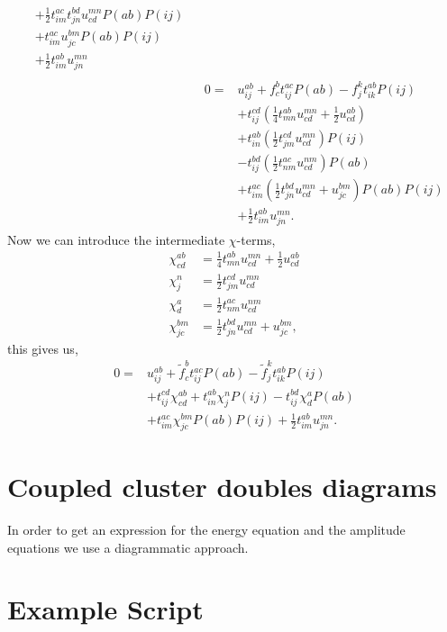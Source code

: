\documentclass[
    a4paper, aps, twocolumn, floatfix, superscriptaddress,
    nofootinbib]{revtex4-1}
\newcommand{\1}{\mathds{1}}
\begin{document}
\begin{align}
\begin{aligned}
          &+ \frac{1}{2}t^{ac}_{im} t^{bd}_{jn} u^{mn}_{cd} P(ab) P(ij) \\
          &+ t^{ac}_{im} u^{bm}_{jc} P(ab) P(ij) \\
          &+ \frac{1}{2}t^{ab}_{im} u^{mn}_{jn}
        \end{aligned} \\
        &\begin{aligned}
        0 =& u^{ab}_{ij} + f^b_c t^{ac}_{ij}P(ab) - f^k_jt^{ab}_{ik}P(ij) \\
          &+ t^{cd}_{ij} \left(\frac{1}{4}t^{ab}_{mn} u^{mn}_{cd} + \frac{1}{2} u^{ab}_{cd} \right) \\
          &+  t^{ab}_{in} \left(\frac{1}{2} t^{cd}_{jm} u^{mn}_{cd}\right) P(ij) \\
          &- t^{bd}_{ij} \left(\frac{1}{2}t^{ac}_{nm}  u^{nm}_{cd}\right) P(ab) \\
          &+ t^{ac}_{im}\left(\frac{1}{2} t^{bd}_{jn} u^{mn}_{cd} + u^{bm}_{jc} \right)P(ab) P(ij) \\
          &+ \frac{1}{2}t^{ab}_{im} u^{mn}_{jn}.
        \end{aligned}
    \end{align}
    Now we can introduce the intermediate $\chi$-terms,
    \begin{align}
        \chi^{ab}_{cd} &= \frac{1}{4}t^{ab}_{mn} u^{mn}_{cd} + \frac{1}{2}u^{ab}_{cd} \\
        \chi^n_j &= \frac{1}{2}t^{cd}_{jm} u^{mn}_{cd} \\
        \chi^a_d &= \frac{1}{2} t^{ac}_{nm} u^{nm}_{cd} \\
        \chi^{bm}_{jc} &= \frac{1}{2}t^{bd}_{jn}u^{mn}_{cd} + u^{bm}_{jc},
    \end{align}
    this gives us,
    \begin{equation}
        \begin{aligned}
            0 =& u^{ab}_{ij} + \tilde{f}^b_c t^{ac}_{ij}P(ab) - \tilde{f}^k_jt^{ab}_{ik}P(ij) \\
              &+ t^{cd}_{ij}\chi^{ab}_{cd} + t^{ab}_{in}\chi^n_jP(ij)
               - t^{bd}_{ij}\chi^a_dP(ab) \\
              &+ t^{ac}_{im}\chi^{bm}_{jc}P(ab)P(ij) + \frac{1}{2}t^{ab}_{im}u^{mn}_{jn}.
        \end{aligned}
    \end{equation}

\section{Coupled cluster doubles diagrams}
    In order to get an expression for the energy equation and the amplitude
    equations we use a diagrammatic approach.

\section{Example Script}

    \vspace{10pt}
    \begin{widetext}
    \inputminted[]{python}{../scripts/comparison.py}
    \end{widetext}



\end{document}
